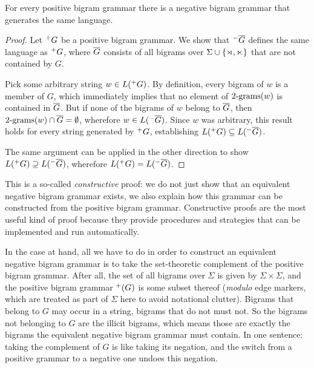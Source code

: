 \begin{lemma}
    For every positive bigram grammar there is a negative bigram grammar that generates the same language.
    \label{lem:SL_Pos2Neg}
\end{lemma}
%
\begin{proof}
    Let $^+ G$ be a positive bigram grammar. 
    We show that $^-  \overline{G} $ defines the same language as $^+ G$, where $ \overline{G} $ consists of all bigrams over $\Sigma \cup \left \{ \rtimes, \ltimes \right \}$ that are not contained by $G$.

    Pick some arbitrary string $w \in L(^+ G)$. 
    By definition, every bigram of $w$ is a member of $G$, which immediately implies that no element of $\mathrm{2\text{-}grams}(w)$ is contained in $ \overline{G} $.
    But if none of the bigrams of $w$ belong to $ \overline{G} $, then $\mathrm{2\text{-}grams}(w) \cap  \overline{G}  = \emptyset$, wherefore $w \in L(^-  \overline{G} )$.
    Since $w$ was arbitrary, this result holds for every string generated by $^+ G$, establishing $L(^+ G) \subseteq L(^-  \overline{G} )$.

    The same argument can be applied in the other direction to show $L(^+ G) \supseteq L(^-  \overline{G} )$, wherefore $L(^+ G) = L(^-  \overline{G} )$.
\end{proof}
%
This is a so-called \emph{constructive} proof: we do not just show that an equivalent negative bigram grammar exists, we also explain how this grammar can be constructed from the positive bigram grammar.
Constructive proofs are the most useful kind of proof because they provide procedures and strategies that can be implemented and run automatically.

In the case at hand, all we have to do in order to construct an equivalent negative bigram grammar is to take the set-theoretic complement of the positive bigram grammar.
After all, the set of all bigrams over $\Sigma$ is given by $\Sigma \times \Sigma$, and the positive bigram grammar $^+ (G)$ is some subset thereof (\emph{modulo} edge markers, which are treated as part of $\Sigma$ here to avoid notational clutter).
Bigrams that belong to $G$ may occur in a string, bigrams that do not must not.
So the bigrams not belonging to $G$ are the illicit bigrams, which means those are exactly the bigrams the equivalent negative bigram grammar must contain.
In one sentence: taking the complement of $G$ is like taking its negation, and the switch from a positive grammar to a negative one undoes this negation.

